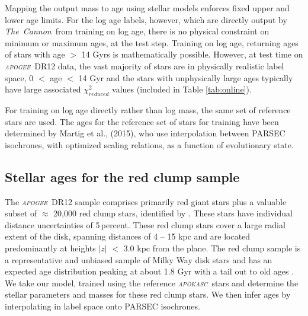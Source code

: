 \documentclass[12pt, preprint]{aastex}
\newcommand{\project}[1]{\textsl{#1}}
\newcommand{\tc}{\project{The~Cannon}}
\newcommand{\apogee}{\project{\textsc{apogee}}}
\newcommand{\apokasc}{\project{\textsc{apokasc}}}
\newcommand{\teff}{\mbox{$\rm T_{eff}$}}
\newcommand{\feh}{\mbox{$\rm [Fe/H]$}}
\newcommand{\alphafe}{\mbox{$\rm [\alpha/Fe]$}}
\newcommand{\logg}{\mbox{$\rm \log g$}}
\begin{document}
Mapping the output mass to age using stellar models enforces fixed upper and lower age limits. For the log age labels, however, which are directly output by \tc\ from training on log age, there is no physical constraint on minimum or maximum ages, at the test step. Training on log age, returning ages of stars with age  $>$ 14 Gyrs is mathematically possible. However, at test time on \apogee\ DR12 data, the vast majority of stars are in physically realistic label space, 0 $<$ age $<$ 14 Gyr and the stars with unphysically large ages typically have large associated $\chi^2_{reduced}$ values (included in Table \ref{tab:online}). 

For training on log age directly rather than log mass, the same set of reference stars are used. The ages for the reference set of stars for training have been determined by Martig et al., (2015), who use interpolation between PARSEC isochrones, with optimized scaling relations, as a function of evolutionary state.






\subsection{Stellar ages for the red clump sample}

The \apogee\ DR12 sample comprises primarily red giant stars plus a valuable subset of  $\approx$ 20,000 red clump stars, identified by \citet{Bovy2014}.  These stars have individual distance uncertainties of 5\,percent. These red clump stars cover a large radial extent of the disk, spanning distances of 4 -- 15 kpc and are located predominantly at heights $|z|$ $<$ 3.0 kpc from the plane. The red clump sample is a representative and unbiased sample of Milky Way disk stars and has an expected age distribution peaking at about 1.8 Gyr with a tail out to old ages \citep[see Figure 15 of][]{Bovy2014}. We take our model, trained using the reference \apokasc\ stars and determine the stellar parameters and masses for these red clump stars. We then infer ages by interpolating in label space onto PARSEC isochrones.
\end{document}
